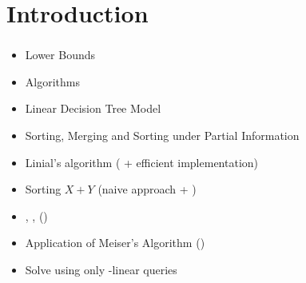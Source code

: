 \section{Introduction}
\begin{frame}\frametitle{\insertsection}\justifying
{}
\begin{itemize}[label={\color{prussianblue}$\bullet$},itemsep=6pt]
\item Lower Bounds\pause
\item Algorithms\pause
\item Linear Decision Tree Model\pause
\end{itemize}
\vspace{.4cm}
\begin{itemize}[label={\color{prussianblue}$\bullet$},itemsep=6pt]
\item Sorting, Merging and Sorting under Partial Information\pause
\item Linial's algorithm (\citet*{linial:1984} + {efficient implementation})\pause
\item Sorting \(X+Y\) (naive approach + \citet*{fredman:1976})\pause
\item \threeSUM{}, \kSUM{}, \kLDT{} (\citet*{gronlund:2014})\pause
\item {Application} of Meiser's Algorithm (\citet*{meiser:1993})\pause
\item {Solve \kSUM{} using only -linear queries}
\end{itemize}
\end{frame}

